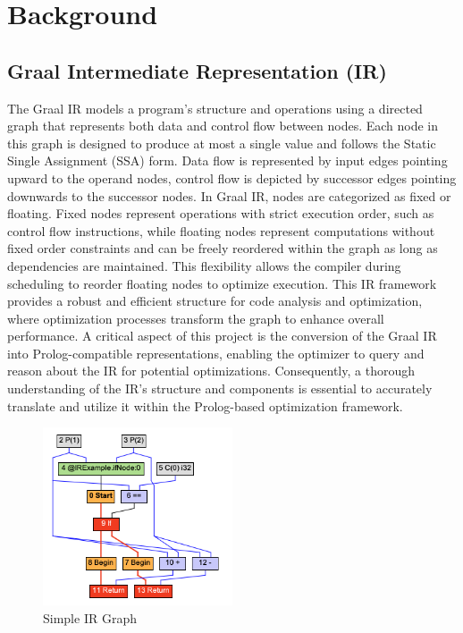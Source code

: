 \chapter[Background]{Background}

\section{Graal Intermediate Representation (IR)}

The Graal IR \cite{Duboscq2013} models a program's structure and operations using a directed graph that represents both data and control flow between nodes. Each node in this graph is designed to produce at most a single value and follows the Static Single Assignment (SSA) \cite{Ron1991} form. Data flow is represented by input edges pointing upward to the operand nodes, control flow is depicted by successor edges pointing downwards to the successor nodes. 
In Graal IR, nodes are categorized as fixed or floating. Fixed nodes represent operations with strict execution order, such as control flow instructions, while floating nodes represent computations without fixed order constraints and can be freely reordered within the graph as long as dependencies are maintained. This flexibility allows the compiler during scheduling to reorder floating nodes to optimize execution. This IR framework provides a robust and efficient structure for code analysis and optimization, where optimization processes transform the graph to enhance overall performance. A critical aspect of this project is the conversion of the Graal IR into Prolog-compatible representations, enabling the optimizer to query and reason about the IR for potential optimizations. Consequently, a thorough understanding of the IR's structure and components is essential to accurately translate and utilize it within the Prolog-based optimization framework.

\begin{figure}[h]
    \centering
    \includegraphics[width=0.5\textwidth]{Packages/graphir.png}
    \caption{Simple IR Graph}
    \label{figure:graphir}
\end{figure}


